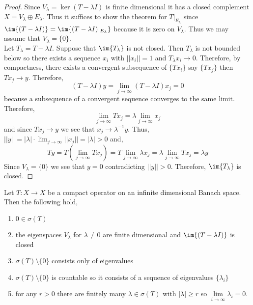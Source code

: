 \documentclass[12pt]{article}
\begin{document}
\begin{proof}
Since $V_\lambda = \ker{(T - \lambda I)}$ is finite dimensional it has a closed complement $X = V_\lambda \oplus E_\lambda$. Thus it suffices to show the theorem for $T|_{E_\lambda}$ since $\im{(T - \lambda I)} = \im{(T - \lambda I)|_{E_\lambda}}$ because it is zero on $V_\lambda$. Thus we may assume that $V_\lambda = \{ 0 \}$.
\bigskip\\
Let $T_\lambda = T - \lambda I$. Suppose that $\im{T_\lambda}$ is not closed. Then $T_\lambda$ is not bounded below so there exists a sequence $x_i$ with $|| x_i || = 1$ and $T_\lambda x_i \to 0$. Therefore, by compactness, there exists a convergent subsequence of $\{ T x_i \}$ say $\{ T x_j \}$ then $T x_j \to y$. Therefore,
\[ (T - \lambda I) y = \lim_{j \to \infty} (T - \lambda I) x_j = 0 \]
because a subsequence of a convergent sequence converges to the same limit. Therefore,
\[ \lim_{j \to \infty} T x_j = \lambda \lim_{j \to \infty} x_j \]
and since $T x_j \to y$ we see that $x_j \to \lambda^{-1} y$.
Thus, $|| y || = | \lambda | \cdot \lim_{j \to \infty} || x_j || = |\lambda| > 0$ and,
\[ T y = T \left( \lim_{j \to \infty} T x_j \right) = T \lim_{j \to \infty} \lambda x_j = \lambda \lim_{j \to \infty} T x_j = \lambda y \]
Since $V_\lambda = \{ 0 \}$ we see that $y = 0$ contradicting $|| y || > 0$. Therefore, $\im{T_\lambda}$ is closed.
\end{proof}

\begin{thm}
Let $T : X \to X$ be a compact operator on an infinite dimensional Banach space. Then the following hold,
\begin{enumerate}
\item $0 \in \sigma(T)$
\item the eigenspaces $V_{\lambda}$ for $\lambda \neq 0$ are finite dimensional and $\im{(T - \lambda I)}$ is closed
\item $\sigma(T) \setminus \{ 0 \}$ consists only of eigenvalues 
\item $\sigma(T) \setminus \{ 0 \}$ is countable so it consists of a sequence of eigenvalues $\{ \lambda_i \}$
\item for any $r > 0$ there are finitely many $\lambda \in \sigma(T)$ with $| \lambda | \ge r$ so $\lim\limits_{i \to \infty} \lambda_i = 0$.
\end{enumerate}
\end{thm}
\end{document}
